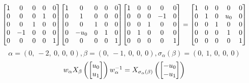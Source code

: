 \documentclass[11pt]{article}
\theoremstyle{definition}
\begin{document}
\[
\scaletoalign{\textwidth}{{\left[\begin{matrix}1 & 0 & 0 & 0 & 0\\0 & 0 & 0 & 1 & 0\\0 & 0 & 1 & 0 & 0\\0 & -1 & 0 & 0 & 0\\0 & 0 & 0 & 0 & 1\end{matrix}\right]} {\left[\begin{matrix}1 & 0 & 0 & 0 & 0\\0 & 1 & 0 & 0 & 0\\0 & 0 & 1 & 0 & 0\\0 & - u_{0} & 0 & 1 & 0\\0 & 0 & 0 & 0 & 1\end{matrix}\right]} {\left[\begin{matrix}1 & 0 & 0 & 0 & 0\\0 & 0 & 0 & -1 & 0\\0 & 0 & 1 & 0 & 0\\0 & 1 & 0 & 0 & 0\\0 & 0 & 0 & 0 & 1\end{matrix}\right]} = {\left[\begin{matrix}1 & 0 & 0 & 0 & 0\\0 & 1 & 0 & u_{0} & 0\\0 & 0 & 1 & 0 & 0\\0 & 0 & 0 & 1 & 0\\0 & 0 & 0 & 0 & 1\end{matrix}\right]}}
\]
\[
\alpha = \left( 0, \  -2, \  0, \  0, \  0\right), \beta = \left( 0, \  -1, \  0, \  0, \  0\right), \sigma_{\alpha}(\beta) = \left( 0, \  1, \  0, \  0, \  0\right)
\]
\[
\scaletoalign{\textwidth}{w_{\alpha} X_{\beta}\left(\left[\begin{matrix}u_{0}\\u_{1}\end{matrix}\right]\right) w_{\alpha}^{-1} = X_{\sigma_{\alpha}\left(\beta\right)}\left(\left[\begin{matrix}- u_{0}\\- u_{1}\end{matrix}\right]\right)}
\]
\end{document}
